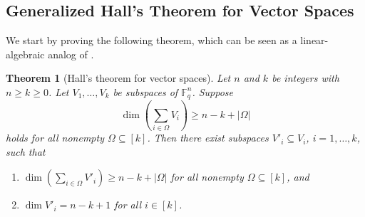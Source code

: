 \documentclass[11pt]{article}
\newif\ifmynotes
\newcommand{\ZGnote}[1]{\ifmynotes\textcolor{purple}{[Zeyu: #1]}\else\fi}
\theoremstyle{plain}
\newtheorem{thm}{Theorem}[section]
\theoremstyle{definition}
\theoremstyle{remark}
\newcommand{\F}{\mathbb{F}}
\begin{document}
\subsection{Generalized Hall's Theorem for Vector Spaces}

We start by proving the following theorem, which can be seen as a linear-algebraic analog of \cite[Theorem~2]{dau2014existence}.


\begin{thm}[Hall’s theorem for vector spaces]\label{hall1}
Let $n$ and $k$ be integers with $n\ge k\geq 0$. Let $V_1,\dots,V_k$ be subspaces of $\F_q^n$. Suppose 
\begin{equation}\label{1}
\dim \left(\sum_{i\in \Omega}V_i\right)\ge n-k+|\Omega|
\end{equation}
holds for all nonempty $\Omega\subseteq [k]$.  
Then there exist subspaces $V'_i\subseteq V_i$, $i=1,\dots,k$, such that
\begin{enumerate}
\item \label{item:hall-1} $\dim \left(\sum_{i\in \Omega}V'_i\right)\ge n-k+|\Omega|$ for all nonempty $\Omega\subseteq [k]$, and
\item \label{item:hall-2} $\dim V'_i=n-k+1$ for all $i\in[k]$.
\end{enumerate}
\end{thm}
\end{document}
